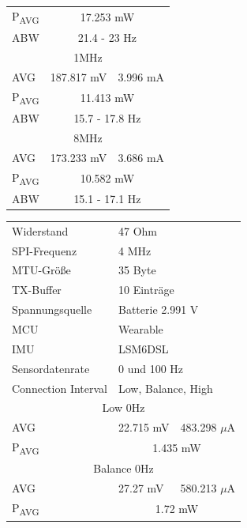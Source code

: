 \begin{figure}[!hbtp]
\begin{minipage}{0.5\textwidth}
\begin{tabular}{|l|l|l|}
      P\textsubscript{AVG} & \multicolumn{2}{c|}{17.253 mW}\\
      ABW & \multicolumn{2}{c|}{21.4 - 23 Hz}\\
      \hline
      \multicolumn{3}{|c|}{1MHz}\\
      AVG & 187.817 mV & 3.996 mA\\
      P\textsubscript{AVG} & \multicolumn{2}{c|}{11.413 mW}\\
      ABW & \multicolumn{2}{c|}{15.7 - 17.8 Hz}\\
      \hline
      \multicolumn{3}{|c|}{8MHz}\\
      AVG & 173.233 mV & 3.686 mA\\
      P\textsubscript{AVG} & \multicolumn{2}{c|}{10.582 mW}\\
      ABW & \multicolumn{2}{c|}{15.1 - 17.1 Hz}\\
      \hline
    \end{tabular}
    \label{tab:test3}
  \end{minipage}
  \begin{minipage}{0.5\textwidth}
    \centering
    \begin{tabular}{|l|l|l|}
      \hline
      Widerstand & \multicolumn{2}{l|}{47 Ohm}\\
      SPI-Frequenz & \multicolumn{2}{l|}{4 MHz}\\
      MTU-Größe & \multicolumn{2}{l|}{35 Byte}\\
      TX-Buffer & \multicolumn{2}{l|}{10 Einträge}\\
      Spannungsquelle & \multicolumn{2}{l|}{Batterie 2.991 V}\\
      MCU & \multicolumn{2}{l|}{Wearable}\\
      IMU & \multicolumn{2}{l|}{LSM6DSL}\\
      Sensordatenrate & \multicolumn{2}{l|}{0 und 100 Hz}\\
      Connection Interval & \multicolumn{2}{l|}{Low, Balance, High}\\
      \hline
      \multicolumn{3}{|c|}{Low 0Hz}\\
      AVG & 22.715 mV & 483.298 $\mu$A\\
      P\textsubscript{AVG} & \multicolumn{2}{c|}{1.435 mW}\\
      \hline
      \multicolumn{3}{|c|}{Balance 0Hz}\\
      AVG & 27.27 mV & 580.213 $\mu$A\\
      P\textsubscript{AVG} & \multicolumn{2}{c|}{1.72 mW}\\

\end{tabular}
\end{minipage}
\end{figure}
